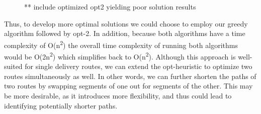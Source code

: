 \documentclass[letterpaper]{article}
\begin{document}
    \begin{figure}[h]
        \caption{** include optimized opt2 yielding poor solution results}
    \end{figure}

    Thus, to develop more optimal solutions we could choose to employ our 
    greedy algorithm followed by opt-2. In addition, because both algorithms 
    have a time complexity of O(n\textsuperscript2) the overall time complexity of running 
    both algorithms would be O(2n\textsuperscript2) which simplifies back to O(n\textsuperscript2). 
    Although this approach is well-suited for single delivery routes, 
    we can extend the opt-heuristic to optimize two routes simultaneously 
    as well. In other words, we can further shorten the paths of two routes 
    by swapping segments of one out for segments of the other. This may be more 
    desirable, as it introduces more flexibility, and thus could lead to identifying 
    potentially shorter paths.
\end{document}
